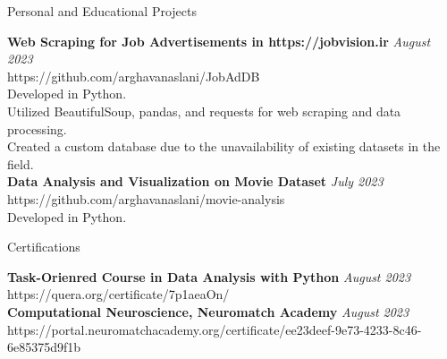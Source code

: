 \documentclass[
	11pt, %
]{resume} %
\begin{document}

\begin{rSection}{Personal and Educational Projects}

	\textbf{Web Scraping for Job Advertisements in https://jobvision.ir} \hfill \textit{August 2023} \\ 
	https://github.com/arghavanaslani/JobAdDB \\
	Developed in Python. \\
	Utilized BeautifulSoup, pandas, and requests for web scraping and data processing. \\
	Created a custom database due to the unavailability of existing datasets in the field.\\

	\textbf{Data Analysis and Visualization on Movie Dataset} \hfill \textit{July 2023} \\ 
	https://github.com/arghavanaslani/movie-analysis \\
	Developed in Python. \\

\end{rSection}


\begin{rSection}{Certifications}

	\textbf{Task-Orienred Course in Data Analysis with Python} \hfill \textit{August 2023} \\ 
	https://quera.org/certificate/7p1aeaOn/ \\

	\textbf{Computational Neuroscience, Neuromatch Academy} \hfill \textit{August 2023} \\ 
	https://portal.neuromatchacademy.org/certificate/ee23deef-9e73-4233-8c46-6e85375d9f1b \\

\end{rSection}

\end{document}
